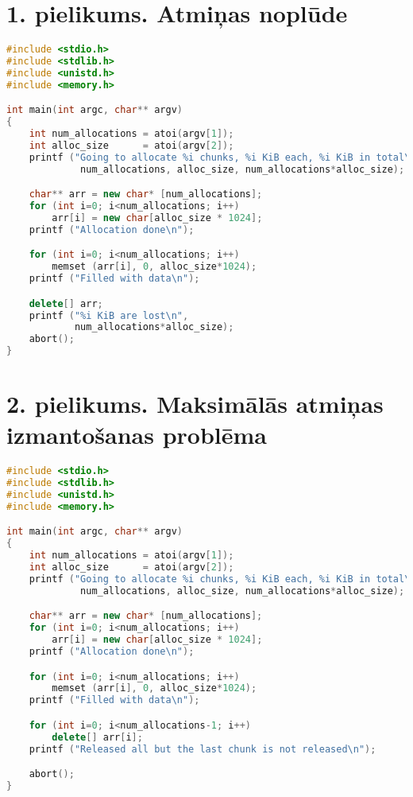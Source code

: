 ﻿

\chapter{1. pielikums. Atmiņas noplūde}

    
   
\begin{lstlisting}[language=C++]
#include <stdio.h>
#include <stdlib.h>
#include <unistd.h>
#include <memory.h>

int main(int argc, char** argv)
{
	int num_allocations = atoi(argv[1]);
	int alloc_size      = atoi(argv[2]);
	printf ("Going to allocate %i chunks, %i KiB each, %i KiB in total\n",
	         num_allocations, alloc_size, num_allocations*alloc_size);

	char** arr = new char* [num_allocations];
	for (int i=0; i<num_allocations; i++)
		arr[i] = new char[alloc_size * 1024];
	printf ("Allocation done\n");

	for (int i=0; i<num_allocations; i++)
		memset (arr[i], 0, alloc_size*1024);
	printf ("Filled with data\n");

	delete[] arr;
	printf ("%i KiB are lost\n", 
			num_allocations*alloc_size);
    abort();
} 
\end{lstlisting}

\newpage
\chapter{2. pielikums. Maksimālās atmiņas izmantošanas problēma}


\begin{lstlisting}[language=C++]
#include <stdio.h>
#include <stdlib.h>
#include <unistd.h>
#include <memory.h>

int main(int argc, char** argv)
{
	int num_allocations = atoi(argv[1]);
	int alloc_size      = atoi(argv[2]);
	printf ("Going to allocate %i chunks, %i KiB each, %i KiB in total\n",
	         num_allocations, alloc_size, num_allocations*alloc_size);

	char** arr = new char* [num_allocations];
	for (int i=0; i<num_allocations; i++)
		arr[i] = new char[alloc_size * 1024];
	printf ("Allocation done\n");

	for (int i=0; i<num_allocations; i++)
		memset (arr[i], 0, alloc_size*1024);
	printf ("Filled with data\n");

	for (int i=0; i<num_allocations-1; i++)
		delete[] arr[i];
	printf ("Released all but the last chunk is not released\n");

	abort();
} 
\end{lstlisting}

